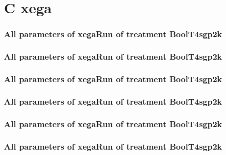 \documentclass[18pt,c]{beamer}
\makeatletter
\let\beamer@writeslidentry@miniframeson=\beamer@writeslidentry
\newcommand*{\miniframeson}{\let\beamer@writeslidentry=\beamer@writeslidentry@miniframeson}
\makeatother
\begin{document}
\miniframeson
\section{C xega}

 \begin{frame}
 \fontsize{8pt}{9pt}\selectfont
 \frametitle{  All parameters of xegaRun of treatment BoolT4sgp2k 
 }

 \label{ExpEtParmTable040.tex}  
 \end{frame}


 \begin{frame}
 \fontsize{8pt}{9pt}\selectfont
 \frametitle{  All parameters of xegaRun of treatment BoolT4sgp2k 
 }

 \label{ExpEtParmTable041.tex}  
 \end{frame}


 \begin{frame}
 \fontsize{8pt}{9pt}\selectfont
 \frametitle{  All parameters of xegaRun of treatment BoolT4sgp2k 
 }

 \label{ExpEtParmTable042.tex}  
 \end{frame}


 \begin{frame}
 \fontsize{8pt}{9pt}\selectfont
 \frametitle{  All parameters of xegaRun of treatment BoolT4sgp2k 
 }

 \label{ExpEtParmTable043.tex}  
 \end{frame}


 \begin{frame}
 \fontsize{8pt}{9pt}\selectfont
 \frametitle{  All parameters of xegaRun of treatment BoolT4sgp2k 
 }

 \label{ExpEtParmTable044.tex}  
 \end{frame}


 \begin{frame}
 \fontsize{8pt}{9pt}\selectfont
 \frametitle{  All parameters of xegaRun of treatment BoolT4sgp2k 
 }

 \label{ExpEtParmTable045.tex}  
 \end{frame}

\end{document}
